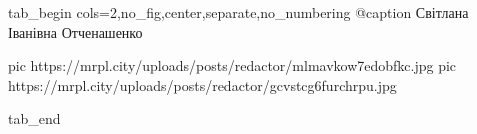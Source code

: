  
 
 
 
 

\ifcmt
  tab_begin cols=2,no_fig,center,separate,no_numbering
	   @caption Світлана Іванівна Отченашенко

     pic https://mrpl.city/uploads/posts/redactor/mlmavkow7edobfkc.jpg
		 pic https://mrpl.city/uploads/posts/redactor/gcvstcg6furchrpu.jpg

  tab_end
\fi
